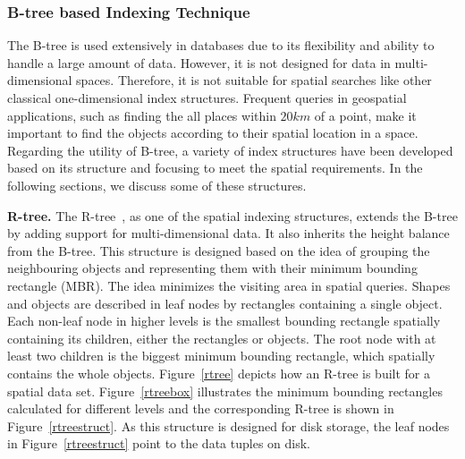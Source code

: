 \documentclass[a4paper,12pt]{article}
\begin{document}
\subsubsection{B-tree based Indexing Technique}
\label{b-tree-based}
The B-tree is used extensively in databases due to its flexibility and ability to handle a large amount of data. However, it is not designed for data in multi-dimensional spaces. Therefore, it is not suitable for spatial searches like other classical one-dimensional index structures. Frequent queries in geospatial applications, such as finding the all places within $20 km$ of a point, make it important to find the objects according to their spatial location in a space. Regarding the utility of B-tree, a variety of index structures have been developed based on its structure and focusing to meet the spatial requirements. In the following sections, we discuss some of these structures.

\textbf{R-tree.} The R-tree~\cite{rtree}, as one of the spatial indexing structures, extends the B-tree by adding support for multi-dimensional data. It also inherits the height balance from the B-tree. This structure is designed based on the idea of grouping the neighbouring objects and representing them with their minimum bounding rectangle (MBR). The idea minimizes the visiting area in spatial queries. Shapes and objects are described in leaf nodes by rectangles containing a single object. Each non-leaf node in higher levels is the smallest bounding rectangle spatially containing its children, either the rectangles or objects. The root node with at least two children is the biggest minimum bounding rectangle, which spatially contains the whole objects. Figure~\ref{rtree} depicts how an R-tree is built for a spatial data set. Figure~\ref{rtreebox} illustrates the minimum bounding rectangles calculated for different levels
and the corresponding R-tree is shown in Figure~\ref{rtreestruct}.
As this structure is designed for disk storage, the leaf nodes in Figure~\ref{rtreestruct} point to the data tuples on disk.
\end{document}
